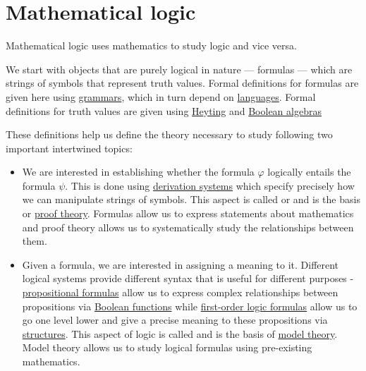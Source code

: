 \section{Mathematical logic}\label{sec:mathematical_logic}

Mathematical logic uses mathematics to study logic and vice versa.

We start with objects that are purely logical in nature --- formulas --- which are strings of symbols that represent truth values. Formal definitions for formulas are given here using \hyperref[def:grammar]{grammars}, which in turn depend on \hyperref[def:language]{languages}. Formal definitions for truth values are given using \hyperref[def:heyting_algebra]{Heyting} and \hyperref[def:boolean_algebra]{Boolean algebras}

These definitions help us define the theory necessary to study following two important intertwined topics:
\begin{itemize}
  \item We are interested in establishing whether the formula \( \varphi \) logically entails the formula \( \psi \). This is done using \hyperref[def:first_order_derivation_system]{derivation systems} which specify precisely how we can manipulate strings of symbols. This aspect is called  or  and is the basis or \hyperref[def:first_order_derivability]{proof theory}. Formulas allow us to express statements about mathematics and proof theory allows us to systematically study the relationships between them.

  \item Given a formula, we are interested in assigning a meaning to it. Different logical systems provide different syntax that is useful for different purposes - \hyperref[def:propositional_syntax/formula]{propositional formulas} allow us to express complex relationships between propositions via \hyperref[subsec:boolean_functions]{Boolean functions} while \hyperref[def:first_order_syntax/formula]{first-order logic formulas} allow us to go one level lower and give a precise meaning to these propositions via \hyperref[def:first_order_structure]{structures}. This aspect of logic is called  and is the basis of \hyperref[subsec:first_order_models]{model theory}. Model theory allows us to study logical formulas using pre-existing mathematics.
\end{itemize}

